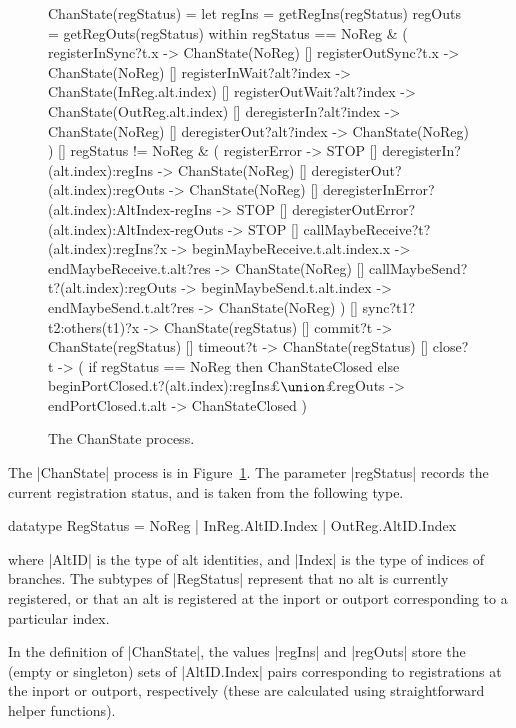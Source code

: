  
\begin{figure}
\begin{cspm}
ChanState(regStatus) = 
  let regIns = getRegIns(regStatus)
      regOuts = getRegOuts(regStatus)
  within
  regStatus == NoReg & (
    registerInSync?t.x -> ChanState(NoReg) 
    [] registerOutSync?t.x -> ChanState(NoReg)
    [] registerInWait?alt?index -> ChanState(InReg.alt.index)
    [] registerOutWait?alt?index -> ChanState(OutReg.alt.index)
    [] deregisterIn?alt?index ->  ChanState(NoReg)
    [] deregisterOut?alt?index ->  ChanState(NoReg)
  )
  []
  regStatus != NoReg & (
    registerError -> STOP
    [] deregisterIn?(alt.index):regIns ->  ChanState(NoReg)
    [] deregisterOut?(alt.index):regOuts -> ChanState(NoReg)
    [] deregisterInError?(alt.index):AltIndex-regIns -> STOP
    [] deregisterOutError?(alt.index):AltIndex-regOuts -> STOP
    [] callMaybeReceive?t?(alt.index):regIns?x -> beginMaybeReceive.t.alt.index.x -> 
         endMaybeReceive.t.alt?res -> ChanState(NoReg)
    [] callMaybeSend?t?(alt.index):regOuts -> beginMaybeSend.t.alt.index -> 
         endMaybeSend.t.alt?res -> ChanState(NoReg)
  )
  [] 
  sync?t1?t2:others(t1)?x -> ChanState(regStatus)
  []
  commit?t -> ChanState(regStatus)
  []
  timeout?t -> ChanState(regStatus)
  []
  close?t -> (
    if regStatus == NoReg then ChanStateClosed
    else    
      beginPortClosed.t?(alt.index):regIns£$\union$£regOuts ->
      endPortClosed.t.alt -> ChanStateClosed
  )
\end{cspm}
\caption{The {\scalashape ChanState} process.  \label{fig:ChanState}}
\end{figure}


The |ChanState| process is in Figure~\ref{fig:ChanState}.  The parameter
|regStatus| records the current registration status, and is taken from the
following type.
%
\begin{cspm}
datatype RegStatus = NoReg | InReg.AltID.Index | OutReg.AltID.Index
\end{cspm}
%
where |AltID| is the type of alt identities, and |Index| is the type of
indices of branches.  The subtypes of |RegStatus| represent that no alt is
currently registered, or that an alt is registered at the inport or outport
corresponding to a particular index.  

In the definition of |ChanState|, the values |regIns| and |regOuts| store the
(empty or singleton) sets of |AltID.Index| pairs corresponding to
registrations at the inport or outport, respectively (these are calculated
using straightforward helper functions).

